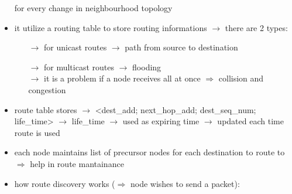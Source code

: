 \begin{itemize}
        for every change in neighbourhood topology
    \item it utilize a routing table to store routing informations $\rightarrow$ there are 2 types:
    \begin{itemize}
        \item[$\rightarrow$] for unicast routes $\rightarrow$ path from source to destination
        \item[$\rightarrow$] for multicast routes $\rightarrow$ flooding\\
        $\rightarrow$ it is a problem if a node receives all at once $\Rightarrow$ collision and congestion
    \end{itemize}
    \item route table stores $\rightarrow$ <dest\_add; next\_hop\_add; dest\_seq\_num; life\_time>
    $\rightarrow$ life\_time $\rightarrow$ used as expiring time $\rightarrow$ updated each time route is used
    \item each node maintains list of precursor nodes for each destination to route to\\$\Rightarrow$ help in route mantainance
    \item how route discovery works ($\Rightarrow$ node wishes to send a packet):
\end{itemize}